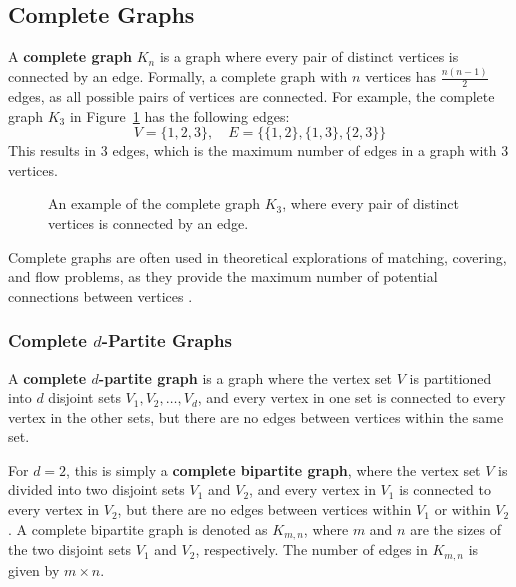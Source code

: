 \subsection{Complete Graphs}
A \textbf{complete graph} \( K_n \) is a graph where every pair of distinct vertices is connected by an edge. Formally, a complete graph with \( n \) vertices has \( \frac{n(n-1)}{2} \) edges, as all possible pairs of vertices are connected. For example, the complete graph \( K_3 \) in Figure~\ref{fig:complete_graph} has the following edges:
\[
V = \{1, 2, 3\}, \quad E = \{\{1, 2\}, \{1, 3\}, \{2, 3\}\}
\]
This results in 3 edges, which is the maximum number of edges in a graph with 3 vertices.

\begin{figure}[h]
\begin{center}
\caption{An example of the complete graph \( K_3 \), where every pair of distinct vertices is connected by an edge.}
\label{fig:complete_graph}
\end{center}
\end{figure}

Complete graphs are often used in theoretical explorations of matching, covering, and flow problems, as they provide the maximum number of potential connections between vertices \cite{yadav2023advanced, cormen2009introduction}.

\subsubsection*{Complete \( d \)-Partite Graphs}

A \textbf{complete \( d \)-partite graph} is a graph where the vertex set \( V \) is partitioned into \( d \) disjoint sets \( V_1, V_2, \dots, V_d \), and every vertex in one set is connected to every vertex in the other sets, but there are no edges between vertices within the same set.

For \( d = 2 \), this is simply a \textbf{complete bipartite graph}, where the vertex set \( V \) is divided into two disjoint sets \( V_1 \) and \( V_2 \), and every vertex in \( V_1 \) is connected to every vertex in \( V_2 \), but there are no edges between vertices within \( V_1 \) or within \( V_2 \). A complete bipartite graph is denoted as \( K_{m,n} \), where \( m \) and \( n \) are the sizes of the two disjoint sets \( V_1 \) and \( V_2 \), respectively. The number of edges in \( K_{m,n} \) is given by \( m \times n \).

